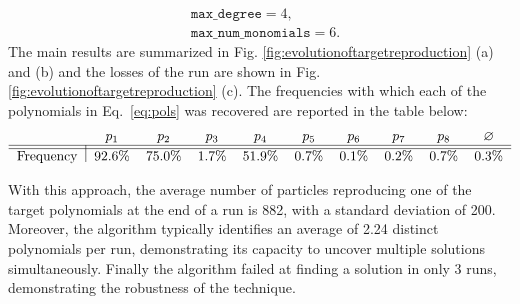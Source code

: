 \documentclass[11pt]{article}
\begin{document}
\begin{equation}
	\begin{aligned}
	&\texttt{max\_degree} = 4,\\
	&\texttt{max\_num\_monomials} = 6.
\end{aligned}
\end{equation}
The main results are summarized in Fig. \ref{fig:evolutionoftargetreproduction} (a) and (b) and the losses of the run are shown in Fig. \ref{fig:evolutionoftargetreproduction} (c). 
The frequencies with which each of the polynomials in Eq.~\eqref{eq:pols} was recovered are reported in the table below:
  \begin{equation}
  	\label{table:results}
	\begin{tabular}{l|ccccccccc}
		& $p_{1}$ & $p_{2}$ & $p_{3}$ & $p_{4}$ & $p_{5}$ & $p_{6}$ & $p_{7}$ & $p_{8}$ &  $\varnothing$  \\\hline\hline
		Frequency & 92.6\% & 75.0\% & 1.7\% & 51.9\% & 0.7\% & 0.1\% & 0.2\% & 0.7\% & 0.3\%
	\end{tabular}
\end{equation}

With this approach, the average number of particles reproducing one of the target polynomials at the end of a run is 882, with a standard deviation of 200. Moreover, the algorithm typically identifies an average of 2.24 distinct polynomials per run, demonstrating its capacity to uncover multiple solutions simultaneously. Finally the algorithm failed at finding a solution in only 3 runs, demonstrating the robustness of the technique. 
\end{document}
